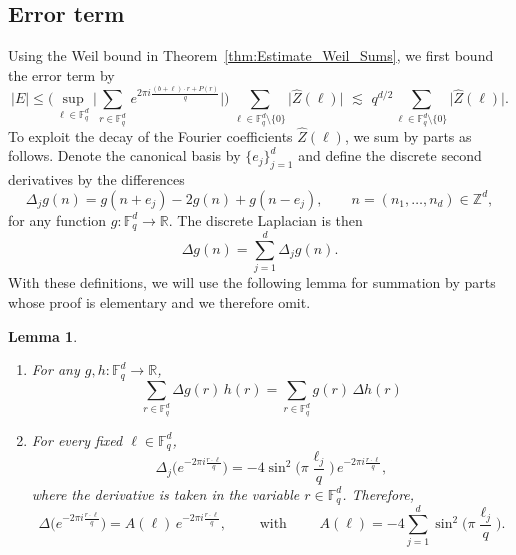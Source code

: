 \documentclass[11pt,reqno]{amsart}
\newtheorem{lem}[thm]{Lemma}
\theoremstyle{definition}
\numberwithin{equation}{section}
\theoremstyle{remark}
\begin{document}
\subsection*{Error term}
Using the Weil bound in Theorem~\ref{thm:Estimate_Weil_Sums}, 
we first bound the error term by
\begin{equation}\label{eq:Error_FirstBound}
    |E| 
    \leq \Bigg( \sup_{\ell \in \mathbb F_q^d} \Big| \sum_{r \in \mathbb F_q^d}   \,  e^{2 \pi  i \frac{(b + \ell) \cdot r + P(r)}{q}} \Big| \Bigg)  \, 
    \sum_{\ell \in \mathbb F_q^d \setminus \{ 0 \} } \big| \widehat Z(\ell) \big|
    \, \, \lesssim \, \, 
    q^{d/2}  \sum_{\ell \in \mathbb F_q^d \setminus \{ 0 \} } \big| \widehat Z(\ell) \big|.
\end{equation}
To exploit the decay of the Fourier coefficients $\widehat Z(\ell)$, we sum by parts as follows. 
Denote the canonical basis by $\{e_j\}_{j=1}^d$
and 
define the discrete second derivatives by the differences
\begin{equation}
    \Delta_j g(n) = g(n + e_j) - 2g(n) + g(n - e_j), \qquad n = (n_1, \ldots, n_d) \in \mathbb Z^d, 
\end{equation}
for any function $g:\mathbb F_q^d \to \mathbb R$. 
The discrete Laplacian is then
\begin{equation}
    \Delta g(n) = \sum_{j=1}^d \Delta_j g(n). 
\end{equation}
With these definitions, we will use the following lemma for summation by parts whose proof is elementary and we therefore omit. 

\begin{lem}\label{thm:Lemma_Sum_by_parts}
    \begin{enumerate}
        \item[(i)] For any $g,h: \mathbb F_q^d \to \mathbb R$, 
        \begin{equation}
            \sum_{r \in \mathbb F_q^d} \Delta g(r) \,  h(r) = \sum_{r \in \mathbb F_q^d}  g(r) \, \Delta h(r)
        \end{equation}
        
        \item[(ii)] For every fixed $\ell \in \mathbb F_q^d$, 
        \begin{equation}
            \Delta_j \Big( e^{-2\pi i \frac{r \cdot \ell}{q}} \Big)
            =
            -4  \sin^2 \Big(\pi \frac{\ell_j}{q}\Big) \, e^{-2\pi i \frac{r \cdot \ell}{q}},  
        \end{equation}
        where the derivative is taken in the variable $r\in \mathbb F_q^d$. Therefore, 
        \begin{equation}
            \Delta \Big( e^{-2\pi i \frac{r \cdot \ell}{q}} \Big)
            = 
            A(\ell) \, e^{-2\pi i \frac{r \cdot \ell}{q}}, 
            \qquad \text{ with } \qquad 
            A(\ell) = -4 \sum_{j=1}^d \sin^2 \big( \pi \frac{\ell_j}{q} \big).
        \end{equation}
    \end{enumerate}
\end{lem}
\end{document}
